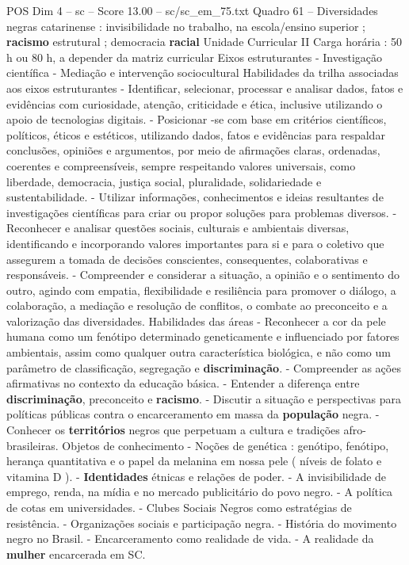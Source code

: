 \begin{textsample}{POS Dim 4 – sc – Score 13.00 – sc/sc\_em\_75.txt}
Quadro 61 – Diversidades negras catarinense : invisibilidade no trabalho, na escola/ensino superior ; \textbf{racismo} estrutural ; democracia \textbf{racial} Unidade Curricular II Carga horária : 50 h ou 80 h, a depender da matriz curricular Eixos estruturantes - Investigação científica - Mediação e intervenção sociocultural Habilidades da trilha associadas aos eixos estruturantes - Identificar, selecionar, processar e analisar dados, fatos e evidências com curiosidade, atenção, criticidade e ética, inclusive utilizando o apoio de tecnologias digitais. - Posicionar -se com base em critérios científicos, políticos, éticos e estéticos, utilizando dados, fatos e evidências para respaldar conclusões, opiniões e argumentos, por meio de afirmações claras, ordenadas, coerentes e compreensíveis, sempre respeitando valores universais, como liberdade, democracia, justiça social, pluralidade, solidariedade e sustentabilidade. - Utilizar informações, conhecimentos e ideias resultantes de investigações científicas para criar ou propor soluções para problemas diversos. - Reconhecer e analisar questões sociais, culturais e ambientais diversas, identificando e incorporando valores importantes para si e para o coletivo que assegurem a tomada de decisões conscientes, consequentes, colaborativas e responsáveis. - Compreender e considerar a situação, a opinião e o sentimento do outro, agindo com empatia, flexibilidade e resiliência para promover o diálogo, a colaboração, a mediação e resolução de conflitos, o combate ao preconceito e a valorização das diversidades.
Habilidades das áreas - Reconhecer a cor da pele humana como um fenótipo determinado geneticamente e influenciado por fatores ambientais, assim como qualquer outra característica biológica, e não como um parâmetro de classificação, segregação e \textbf{discriminação}. - Compreender as ações afirmativas no contexto da educação básica. - Entender a diferença entre \textbf{discriminação}, preconceito e \textbf{racismo}. - Discutir a situação e perspectivas para políticas públicas contra o encarceramento em massa da \textbf{população} negra. - Conhecer os \textbf{territórios} negros que perpetuam a cultura e tradições afro-brasileiras.
Objetos de conhecimento - Noções de genética : genótipo, fenótipo, herança quantitativa e o papel da melanina em nossa pele ( níveis de folato e vitamina D ). - \textbf{Identidades} étnicas e relações de poder. - A invisibilidade de emprego, renda, na mídia e no mercado publicitário do povo negro. - A política de cotas em universidades. - Clubes Sociais Negros como estratégias de resistência. - Organizações sociais e participação negra. - História do movimento negro no Brasil. - Encarceramento como realidade de vida. - A realidade da \textbf{mulher} encarcerada em SC.

\end{textsample}
